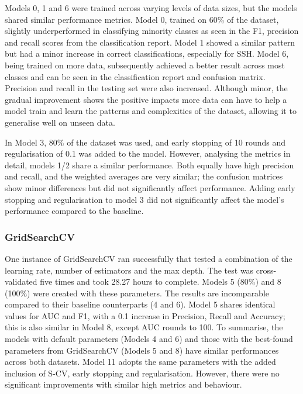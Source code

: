 \smallskip
Models 0, 1 and 6 were trained across varying levels of data sizes, but the models shared similar performance metrics. Model 0, trained on 60\% of the dataset, slightly underperformed in classifying minority classes as seen in the F1, precision and recall scores from the classification report. Model 1 showed a similar pattern but had a minor increase in correct classifications, especially for SSH. Model 6, being trained on more data, subsequently achieved a better result across most classes and can be seen in the classification report and confusion matrix. Precision and recall in the testing set were also increased. Although minor, the gradual improvement shows the positive impacts more data can have to help a model train and learn the patterns and complexities of the dataset, allowing it to generalise well on unseen data.

\smallskip
In Model 3, 80\% of the dataset was used, and early stopping of 10 rounds and regularisation of 0.1 was added to the model. However, analysing the metrics in detail, models 1/2 share a similar performance. Both equally have high precision and recall, and the weighted averages are very similar; the confusion matrices show minor differences but did not significantly affect performance. Adding early stopping and regularisation to model 3 did not significantly affect the model's performance compared to the baseline. 

\medskip

\subsubsection*{GridSearchCV}

\smallskip
One instance of GridSearchCV ran successfully that tested a combination of the learning rate, number of estimators and the max depth. The test was cross-validated five times and took 28.27 hours to complete. Models 5 (80\%) and 8 (100\%) were created with these parameters. The results are incomparable compared to their baseline counterparts (4 and 6). Model 5 shares identical values for AUC and F1, with a 0.1 increase in Precision, Recall and Accuracy; this is also similar in Model 8, except AUC rounds to 100. To summarise, the models with default parameters (Models 4 and 6) and those with the best-found parameters from GridSearchCV (Models 5 and 8) have similar performances across both datasets. Model 11 adopts the same parameters with the added inclusion of S-CV, early stopping and regularisation. However, there were no significant improvements with similar high metrics and behaviour.


